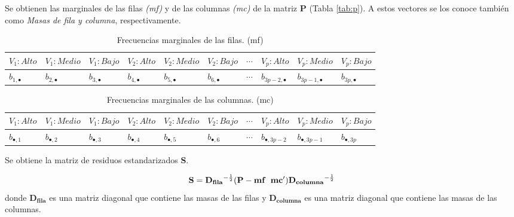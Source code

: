 \documentclass[mathematics,article,submit,moreauthors,pdftex]{mdpi}
\begin{document}
Se obtienen las marginales de las filas \emph{(mf)} y de las columnas
\emph{(mc)} de la matriz \textbf{P} (Tabla \ref{tab:p}). A estos
vectores se los conoce también como \emph{Masas de fila y columna},
respectivamente.

\begin{table}[!ht]
\begin{center}
 \begin{tabular}{||p{1cm}p{1cm}p{1cm}||p{1cm}p{1cm} p{1cm} ||p{1cm} ||p{1cm} p{1cm} p{1cm} ||} 
 \hline
 $V_{1}:Alto$ &$V_{1}:Medio$ &$V_{1}:Bajo$ & $V_{2}:Alto$ & $V_{2}:Medio$ & $V_{2}:Bajo$ & $\cdots$ & $V_{p}:Alto$ & $V_{p}:Medio$ & $V_{p}:Bajo$ \\ [0.5ex] 
 \hline
    $b_{1,\bullet}$ & $b_{2, \bullet}$ & $b_{3, \bullet}$ & $b_{4, \bullet}$ & $b_{5, \bullet}$ & $b_{6, \bullet}$ & $\cdots$ & $b_{3p-2, \bullet}$ & $b_{3p-1,\bullet}$ & $b_{3p, \bullet}$ \\ [0.5ex] 
 \hline
\end{tabular}
\caption{Frecuencias marginales de las filas. (mf)}
\label{tab:margfilas}
\end{center}
\end{table}

\begin{table}[h!]
\begin{center}
 \begin{tabular}{||p{1cm}p{1cm}p{1cm}||p{1cm}p{1cm} p{1cm} ||p{1cm} ||p{1cm} p{1cm} p{1cm} ||} 
 \hline
 $V_{1}:Alto$ &$V_{1}:Medio$ &$V_{1}:Bajo$ & $V_{2}:Alto$ & $V_{2}:Medio$ & $V_{2}:Bajo$ & $\cdots$ & $V_{p}:Alto$ & $V_{p}:Medio$ & $V_{p}:Bajo$ \\ [0.5ex] 
 \hline
    $b_{\bullet,1}$ & $b_{\bullet,2}$ & $b_{\bullet,3}$ & $b_{\bullet,4}$ & $b_{\bullet,5}$ & $b_{\bullet,6}$ & $\cdots$ & $b_{\bullet,3p-2}$ & $b_{\bullet,3p-1}$ & $b_{\bullet,3p}$ \\ [0.5ex] 
 \hline
\end{tabular}
\caption{Frecuencias marginales de las columnas. (mc)}
\label{tab:margcolumnas}
\end{center}
\end{table}

Se obtiene la matriz de residuos estandarizados \textbf{S}.

\begin{equation}
\mathbf{S}=\mathbf{D_{fila}}^{-\frac{1}{2}}(\mathbf{P}-\mathbf{mf} \hspace{0.2cm} \mathbf{mc'})\mathbf{D_{columna}}^{-\frac{1}{2}}
\label{eq:s}
\end{equation} donde \(\mathbf{D_{fila}}\) es una matriz diagonal que
contiene las masas de las filas y \(\mathbf{D_{columna}}\) es una matriz
diagonal que contiene las masas de las columnas.
\end{document}
